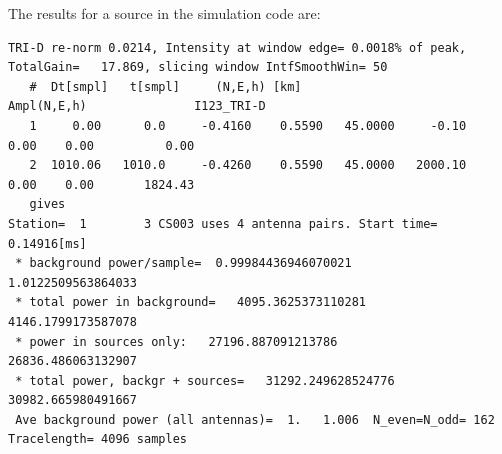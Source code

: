 The results for a source in the simulation code are:
\begin{verbatim}
TRI-D re-norm 0.0214, Intensity at window edge= 0.0018% of peak, TotalGain=   17.869, slicing window IntfSmoothWin= 50
   #  Dt[smpl]   t[smpl]     (N,E,h) [km]                   Ampl(N,E,h)               I123_TRI-D
   1     0.00      0.0     -0.4160    0.5590   45.0000     -0.10    0.00    0.00          0.00
   2  1010.06   1010.0     -0.4260    0.5590   45.0000   2000.10    0.00    0.00       1824.43
   gives
Station=  1        3 CS003 uses 4 antenna pairs. Start time=   0.14916[ms]
 * background power/sample=  0.99984436946070021        1.0122509563864033
 * total power in background=   4095.3625373110281        4146.1799173587078
 * power in sources only:   27196.887091213786        26836.486063132907
 * total power, backgr + sources=   31292.249628524776        30982.665980491667
 Ave background power (all antennas)=  1.   1.006  N_even=N_odd= 162  Tracelength= 4096 samples
\end{verbatim}
